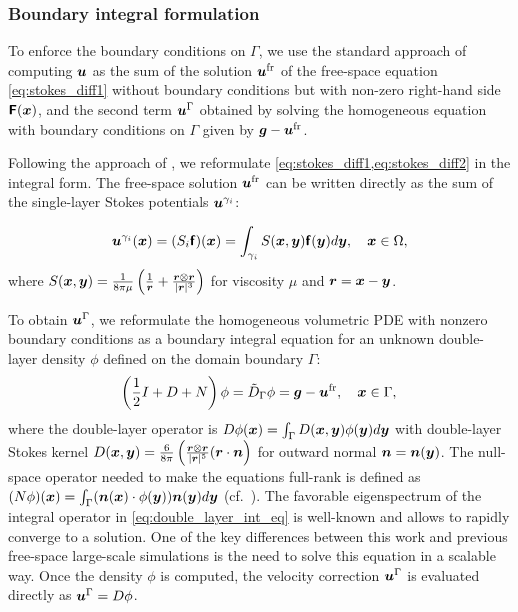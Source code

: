 \subsubsection{Boundary integral formulation}
To enforce the boundary conditions on $\Gamma$, we use the standard approach of computing
${\bm{u}}$ as the sum of the solution ${\bm{u}}^{\text{fr}}$ of the free-space equation  
\cref{eq:stokes_diff1} without boundary conditions but with non-zero right-hand side $\bm{\mathsf{F}}({\bm{x}})$,
and  the second term  ${\bm{u}}^{\Gamma}$ obtained by solving the
homogeneous equation with boundary conditions on $\Gamma$ given by
$\bm{g}-{\bm{u}}^{\text{fr}}$. 

Following the approach of
\cite{Power1987,Poz92,lu2018parallel,nazockdast2015b}, we reformulate
\cref{eq:stokes_diff1,eq:stokes_diff2} in the integral form. The
free-space solution ${\bm{u}}^{\text{fr}}$ can be written
directly as the sum of the single-layer Stokes potentials ${\bm{u}}^{\gamma_i}$:

\begin{equation}
  {\bm{u}}^{\gamma_i}({\bm{x}}) = (S_i\bm{\mathsf{f}})({\bm{x}}) = \int_{\gamma_i} S({\bm{x}},{\bm{y}})
  \bm{\mathsf{f}}({\bm{y}}) d{\bm{y}}, \quad {\bm{x}} \in \Omega,
\label{eq:sl_stokes}
\end{equation}
where $S({\bm{x}},{\bm{y}}) = \frac{1}{8\pi\mu}\left(\frac{1}{{\bm{r}}} + \frac{{\bm{r}} \otimes {\bm{r}}}{|{\bm{r}}|^3}\right)$ for viscosity $\mu$ and ${\bm{r}} = {\bm{x}} - {\bm{y}}$.


To obtain ${\bm{u}}^\Gamma$, we reformulate the homogeneous volumetric PDE with nonzero boundary conditions
as a boundary integral equation for an unknown double-layer density $\phi$ defined on the domain boundary $\Gamma$: 
\begin{equation}
  \left(\frac{1}{2}I + D + N \right)\phi = \tilde{D}_\Gamma\phi =  \bm{g}-{\bm{u}}^{\text{fr}}, \quad {\bm{x}} \in \Gamma,
  \label{eq:double_layer_int_eq}\\
\end{equation}
where the double-layer operator is $D\phi({\bm{x}}) = \int_\Gamma D({\bm{x}},{\bm{y}}) \phi({\bm{y}}) d{\bm{y}}$ with double-layer Stokes kernel $D({\bm{x}},{\bm{y}}) = \frac{6}{8\pi}\left(\frac{{\bm{r}} \otimes {\bm{r}}}{|{\bm{r}}|^5}({\bm{r}}\cdot{\bm{n}}\right)$ for outward normal ${\bm{n}}={\bm{n}}({\bm{y}})$.
The null-space operator needed to make the equations full-rank is defined as
$(N\phi)({\bm{x}}) = \int_\Gamma ({\bm{n}}({\bm{x}}) \cdot \phi({\bm{y}})){\bm{n}}({\bm{y}}) d{\bm{y}}$ (cf.\ \cite{lu2017}).
The favorable eigenspectrum of the integral operator in \cref{eq:double_layer_int_eq} is well-known and allows \gmres to rapidly converge to a solution.
One of the key differences between this work and previous free-space large-scale simulations
is the need to solve this equation in a scalable way. Once the density $\phi$ is computed,
the velocity correction ${\bm{u}}^\Gamma$ is evaluated directly as ${\bm{u}}^{\Gamma} = D\phi$.



